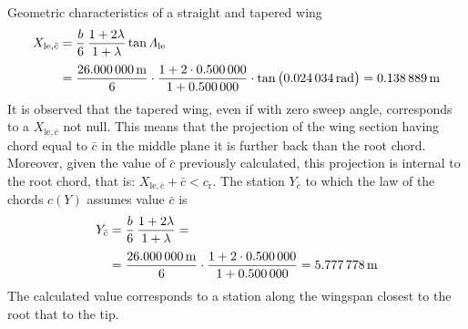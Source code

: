 \documentclass[[12pt,twoside]{book}
\begin{document}
\begin{myExampleX}{Geometric characteristics of a straight and tapered wing}{}
\[
\begin{split}
X_{\mathrm{le},\bar{c}} 
  & {}=
    \frac{b}{6} \, \frac{1+2\lambda}{1+\lambda} \tan\Lambda_\mathrm{le} \\[3pt]
  & {}=
    \frac{\SI[round-precision=0]{\mySpanWingMT}{\metre}}{6}
      \cdot 
      \frac{
        1 + 2\cdot\SI[round-precision=2]{\myTaperRatioWing}{}
      }{
        1 + \SI[round-precision=2]{\myTaperRatioWing}{}
      }
      \cdot \tan \big( \SI[round-precision=3]{\myLambdaLERad}{\radian} \big)
    =  \SI[round-precision=2]{\myXLEMACWingMT}{\metre} %
\end{split}
\]
It is observed that the tapered wing, even if with zero sweep angle, corresponds to a $X_{\mathrm{le},\bar{c}}$ not null. This means that the projection of the wing section having chord equal to $\bar{c}$ in the middle plane it is further back than the root chord. Moreover, given the value of $\bar{c}$ previously calculated, this projection is internal to the root chord, that is:
$X_{\mathrm{le},\bar{c}}+\bar{c}<c_\mathrm{r}$.
The  station $Y_{\bar{c}}$ to which the law of the chords $c(Y)$ assumes value $\bar{c}$ is
\[
\begin{split}
Y_{\bar{c}} 
  & {}=
    \frac{b}{6} \, \frac{1+2\lambda}{1+\lambda} = \\[3pt]
  & {}=
    \frac{\SI[round-precision=0]{\mySpanWingMT}{\metre}}{6}
      \cdot 
      \frac{
        1 + 2\cdot\SI[round-precision=2]{\myTaperRatioWing}{}
      }{
        1 + \SI[round-precision=2]{\myTaperRatioWing}{}
      }
    =  \SI[round-precision=2]{\myYMACWingMT}{\metre} 
\end{split}
\]
The calculated value corresponds to a station along the wingspan closest to the root that to the tip.
\end{myExampleX}
\end{document}
